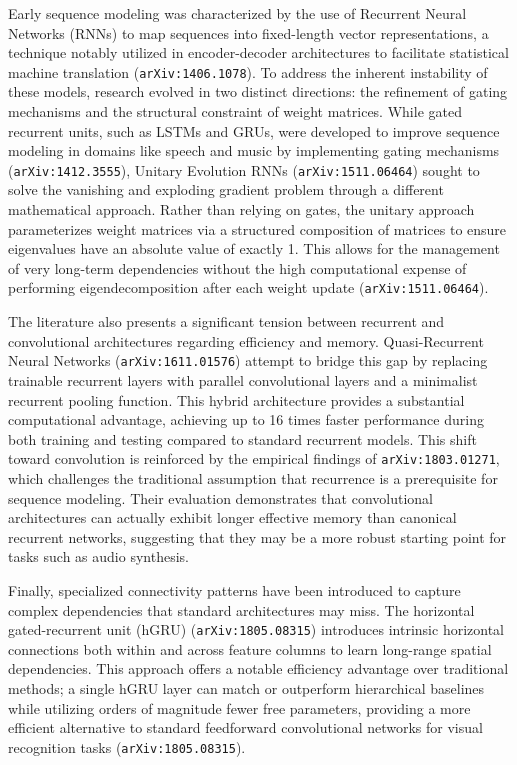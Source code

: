 \documentclass[11pt]{article}
\begin{document}
Early sequence modeling was characterized by the use of Recurrent Neural Networks (RNNs) to map sequences into fixed-length vector representations, a technique notably utilized in encoder-decoder architectures to facilitate statistical machine translation (\texttt{arXiv:1406.1078}). To address the inherent instability of these models, research evolved in two distinct directions: the refinement of gating mechanisms and the structural constraint of weight matrices. While gated recurrent units, such as LSTMs and GRUs, were developed to improve sequence modeling in domains like speech and music by implementing gating mechanisms (\texttt{arXiv:1412.3555}), Unitary Evolution RNNs (\texttt{arXiv:1511.06464}) sought to solve the vanishing and exploding gradient problem through a different mathematical approach. Rather than relying on gates, the unitary approach parameterizes weight matrices via a structured composition of matrices to ensure eigenvalues have an absolute value of exactly 1. This allows for the management of very long-term dependencies without the high computational expense of performing eigendecomposition after each weight update (\texttt{arXiv:1511.06464}).

The literature also presents a significant tension between recurrent and convolutional architectures regarding efficiency and memory. Quasi-Recurrent Neural Networks (\texttt{arXiv:1611.01576}) attempt to bridge this gap by replacing trainable recurrent layers with parallel convolutional layers and a minimalist recurrent pooling function. This hybrid architecture provides a substantial computational advantage, achieving up to 16 times faster performance during both training and testing compared to standard recurrent models. This shift toward convolution is reinforced by the empirical findings of \texttt{arXiv:1803.01271}, which challenges the traditional assumption that recurrence is a prerequisite for sequence modeling. Their evaluation demonstrates that convolutional architectures can actually exhibit longer effective memory than canonical recurrent networks, suggesting that they may be a more robust starting point for tasks such as audio synthesis.

Finally, specialized connectivity patterns have been introduced to capture complex dependencies that standard architectures may miss. The horizontal gated-recurrent unit (hGRU) (\texttt{arXiv:1805.08315}) introduces intrinsic horizontal connections both within and across feature columns to learn long-range spatial dependencies. This approach offers a notable efficiency advantage over traditional methods; a single hGRU layer can match or outperform hierarchical baselines while utilizing orders of magnitude fewer free parameters, providing a more efficient alternative to standard feedforward convolutional networks for visual recognition tasks (\texttt{arXiv:1805.08315}).
\end{document}
